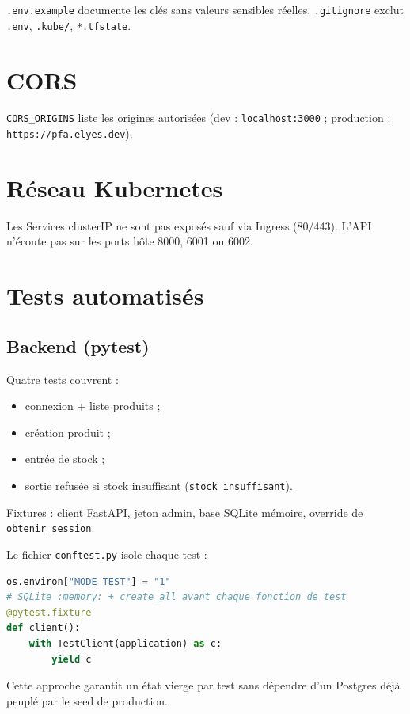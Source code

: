 \texttt{.env.example} documente les clés sans valeurs sensibles réelles. \texttt{.gitignore} exclut \texttt{.env}, \texttt{.kube/}, \texttt{*.tfstate}.

\section{CORS}

\texttt{CORS\_ORIGINS} liste les origines autorisées (dev : \texttt{localhost:3000} ; production : \texttt{https://pfa.elyes.dev}).

\section{Réseau Kubernetes}

Les Services clusterIP ne sont pas exposés sauf via Ingress (80/443). L'API n'écoute pas sur les ports hôte 8000, 6001 ou 6002.

\section{Tests automatisés}

\subsection{Backend (pytest)}

Quatre tests couvrent :
\begin{itemize}
  \item connexion + liste produits ;
  \item création produit ;
  \item entrée de stock ;
  \item sortie refusée si stock insuffisant (\texttt{stock\_insuffisant}).
\end{itemize}

Fixtures : client FastAPI, jeton admin, base SQLite mémoire, override de \texttt{obtenir\_session}.

Le fichier \texttt{conftest.py} isole chaque test :
\begin{lstlisting}[language=Python,caption={Stratégie de test (extrait conftest)}]
os.environ["MODE_TEST"] = "1"
# SQLite :memory: + create_all avant chaque fonction de test
@pytest.fixture
def client():
    with TestClient(application) as c:
        yield c
\end{lstlisting}

Cette approche garantit un état vierge par test sans dépendre d'un Postgres déjà peuplé par le seed de production.

